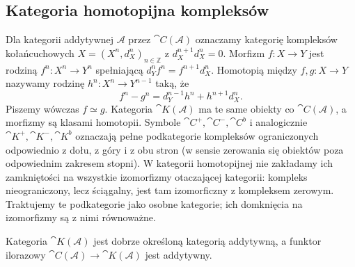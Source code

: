 \subsection{Kategoria homotopijna kompleksów}
\begin{definicja}\label{cat:def:complex-category}
Dla kategorii addytywnej $\mathcal A$ przez $\cat{C}(\mathcal A)$ oznaczamy kategorię kompleksów kołańcuchowych $X=(X^n,d_X^n)_{n\in\mathbb Z}$ z $d_X^{n+1}d_X^n=0$. Morfizm $f:X\to Y$ jest rodziną $f^n:X^n\to Y^n$ spełniającą $d_Y^nf^n=f^{n+1}d_X^n$. Homotopią między $f,g:X\to Y$ nazywamy rodzinę $h^n:X^n\to Y^{n-1}$ taką, że
\begin{equation}\label{cat:eq:cochain-homotopy}
 f^n-g^n=d_Y^{n-1}h^n+h^{n+1}d_X^n.
\end{equation}
Piszemy wówczas $f\simeq g$. Kategoria $\cat{K}(\mathcal A)$ ma te same obiekty co $\cat{C}(\mathcal A)$, a morfizmy są klasami homotopii. Symbole $\cat{C}^+,\cat{C}^-,\cat{C}^b$ i analogicznie $\cat{K}^+,\cat{K}^-,\cat{K}^b$ oznaczają pełne podkategorie kompleksów ograniczonych odpowiednio z dołu, z góry i z obu stron (w sensie zerowania się obiektów poza odpowiednim zakresem stopni). W kategorii homotopijnej nie zakładamy ich zamkniętości na wszystkie izomorfizmy otaczającej kategorii: kompleks nieograniczony, lecz ściągalny, jest tam izomorficzny z kompleksem zerowym. Traktujemy te podkategorie jako osobne kategorie; ich domknięcia na izomorfizmy są z nimi równoważne.
\end{definicja}
\begin{stwierdzenie}\label{cat:prop:homotopy-category}
Kategoria $\cat{K}(\mathcal A)$ jest dobrze określoną kategorią addytywną, a funktor ilorazowy $\cat{C}(\mathcal A)\to\cat{K}(\mathcal A)$ jest addytywny.
\end{stwierdzenie}
